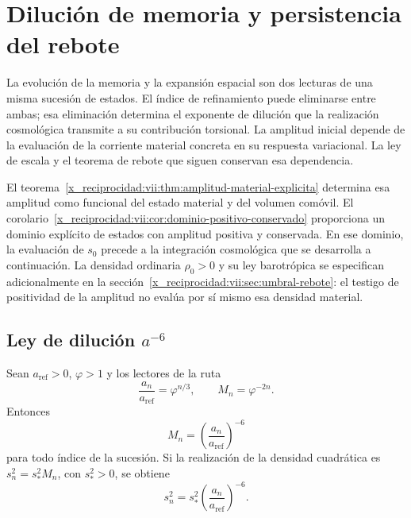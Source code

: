 


\chapter{Dilución de memoria y persistencia del rebote}
\label{x_reciprocidad:vii:sec:dilucion-rebote}

La evolución de la memoria y la expansión espacial son dos lecturas de
una misma sucesión de estados. El índice de refinamiento puede eliminarse
entre ambas; esa eliminación determina el exponente de dilución que la
realización cosmológica transmite a su contribución torsional.
La amplitud inicial depende de la evaluación de la corriente material
concreta en su respuesta variacional. La ley de escala y el teorema
de rebote que siguen conservan esa dependencia.

El teorema~\ref{x_reciprocidad:vii:thm:amplitud-material-explicita} determina esa
amplitud como funcional del estado material y del volumen comóvil.
El corolario~\ref{x_reciprocidad:vii:cor:dominio-positivo-conservado} proporciona
un dominio explícito de estados con amplitud positiva y conservada.
En ese dominio, la evaluación de \(s_0\) precede a la integración
cosmológica que se desarrolla a continuación. La densidad ordinaria
\(\rho_0>0\) y su ley barotrópica se especifican adicionalmente en la
sección~\ref{x_reciprocidad:vii:sec:umbral-rebote}: el testigo de positividad de la
amplitud no evalúa por sí mismo esa densidad material.

\section{Ley de dilución \texorpdfstring{\(a^{-6}\)}{a elevado a -6}}
\label{x_reciprocidad:vii:sec:dilucion}

\begin{proposition}
\label{x_reciprocidad:vii:prop:dilucion}
Sean \(a_{\mathrm{ref}}>0\), \(\varphi>1\) y los lectores de la ruta
\[
 \frac{a_n}{a_{\mathrm{ref}}}=\varphi^{n/3},\qquad
 M_n=\varphi^{-2n}.
\]
Entonces
\[
 M_n=\left(\frac{a_n}{a_{\mathrm{ref}}}\right)^{-6}
\]
para todo índice de la sucesión. Si la realización de la densidad
cuadrática es \(s_n^2=s_*^2M_n\), con \(s_*^2>0\), se obtiene
\[
 s_n^2=s_*^2\left(\frac{a_n}{a_{\mathrm{ref}}}\right)^{-6}.
\]
\end{proposition}

